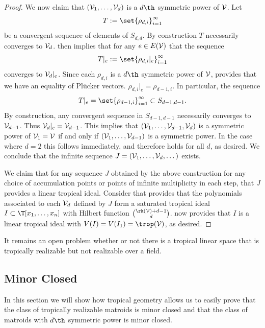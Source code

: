 \begin{proof}
We now claim that $(\mathcal{V}_1,\dots,\mathcal{V}_d)$ is a $d\th$ symmetric power of $\mathcal{V}$. Let 
$$T:=\set{\rho_{d,i}}_{i=1}^\infty$$
be a convergent sequence of elements of $S_{d,d}$. By construction $T$ necessarily converges to $\mathcal{V}_d$.  then implies that for any $e \in E(\mathcal{V})$ that the sequence
$$T|_e:=\set{\rho_{d,i}|_{e}}_{i=1}^\infty$$
converges to $\mathcal{V}_d|_e$. Since each $\rho_{d,i}$ is a $d\th$ symmetric power of $\mathcal{V}$,  provides that we have an equality of Pl\"ucker vectors. $\rho_{d,i}|_{e}=\rho_{d-1,i}$.
In particular, the sequence
$$T|_e = \set{\rho_{d-1,i}}_{i=1}^\infty\subset S_{d-1,d-1}.$$
By construction, any convergent sequence in $S_{d-1,d-1}$ necessarily converges to $\mathcal{V}_{d-1}$. Thus $\mathcal{V}_d|_e=\mathcal{V}_{d-1}$. This implies that $(\mathcal{V}_1,\dots,\mathcal{V}_{d-1},\mathcal{V}_d)$ is a symmetric power of $\mathcal{V}_1=\mathcal{V}$ if and only if $(\mathcal{V}_1,\dots,\mathcal{V}_{d-1})$ is a symmetric power. In the case where $d=2$ this follows immediately, and therefore holds for all $d$, as desired. We conclude that the infinite sequence $J=(\mathcal{V}_1,\dots,\mathcal{V}_d, \dots)$ exists.

We claim that for any sequence $J$ obtained by the above construction for any choice of accumulation points or points of infinite multiplicity in each step, that $J$ provides a linear tropical ideal. Consider that  provides that the polynomials associated to each $\mathcal{V}_d$ defined by $J$ form a saturated tropical ideal $I\subset \T[x_1,\dots,x_n]$ with Hilbert function $\binom{\rk(\sV)+d-1}{d}$.  now provides that $I$ is a linear tropical ideal with $V(I)=V(I_1)=\trop(\sV)$, as desired.
\end{proof}

\begin{remark}
It remains an open problem whether or not there is a tropical linear space that is tropically realizable but not realizable over a field. 
\end{remark}

\subsection{Minor Closed}\label{subsec:MinorClosed}

In this section we will show how tropical geometry allows us to easily prove that the class of tropically realizable matroids is minor closed and that the class of matroids with $d\th$ symmetric power is minor closed.
    
